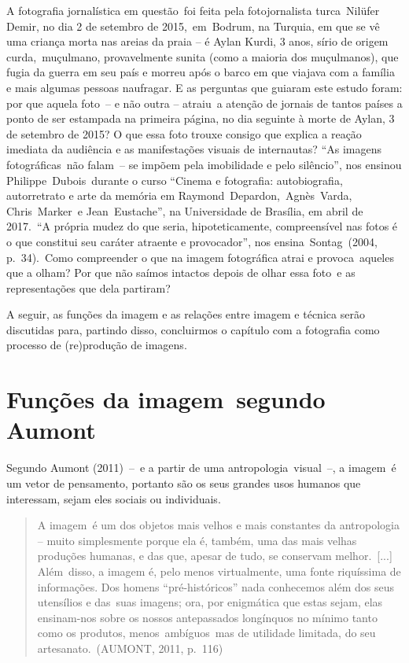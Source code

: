 \documentclass[
  letterpaper,
]{abntex2}
\begin{document}
A fotografia jornalística em questão~foi feita pela fotojornalista
turca~Nilüfer Demir, no dia 2 de setembro de 2015,~em~Bodrum, na
Turquia, em que se vê uma criança morta nas areias da praia -- é Aylan
Kurdi, 3 anos, sírio de origem curda,~muçulmano, provavelmente sunita
(como a maioria dos muçulmanos), que fugia da guerra em seu país e
morreu após o barco em que viajava com a família e mais algumas pessoas
naufragar. E as perguntas que guiaram este estudo foram: por que aquela
foto~-- e não outra -- atraiu~a atenção de jornais de tantos países a
ponto de ser estampada na primeira página, no dia seguinte à morte de
Aylan, 3 de setembro de 2015? O que essa foto trouxe consigo que explica
a reação imediata da audiência e as manifestações visuais de
internautas? ``As imagens fotográficas~não falam~-- se impõem pela
imobilidade e pelo silêncio'', nos ensinou Philippe~Dubois~durante o
curso ``Cinema e fotografia: autobiografia, autorretrato e arte da
memória em Raymond~Depardon,~Agnès~Varda, Chris~Marker~e
Jean~Eustache'', na Universidade de Brasília, em abril de 2017.~``A
própria mudez do que seria, hipoteticamente, compreensível nas fotos é o
que constitui seu caráter atraente e provocador'', nos
ensina~Sontag~(2004, p.~34).~Como compreender o que na imagem
fotográfica atrai e provoca~aqueles que a olham? Por que não saímos
intactos depois de olhar essa foto~e as representações que dela
partiram?

A seguir, as funções da imagem e as relações entre imagem e técnica
serão discutidas para, partindo disso, concluirmos o capítulo com a
fotografia como processo de (re)produção de imagens.~ ~

\hypertarget{funuxe7uxf5es-da-imagem-segundo-aumont}{%
\section{Funções da imagem~segundo
Aumont~}\label{funuxe7uxf5es-da-imagem-segundo-aumont}}

Segundo Aumont (2011)~--~e a partir de uma antropologia~visual~--, a
imagem~é um vetor de pensamento, portanto são os seus grandes usos
humanos que interessam, sejam eles sociais ou individuais.~ ~

\begin{quote}
A imagem~é um dos objetos mais velhos e mais constantes da antropologia
-- muito simplesmente porque ela é, também, uma das mais velhas
produções humanas, e das que, apesar de tudo, se conservam
melhor.~{[}...{]} Além~disso, a imagem é, pelo menos virtualmente, uma
fonte riquíssima de informações. Dos homens ``pré-históricos'' nada
conhecemos além dos seus utensílios e das~suas imagens; ora, por
enigmática que estas sejam, elas ensinam-nos sobre os nossos
antepassados longínquos no mínimo tanto como os produtos,
menos~ambíguos~mas de utilidade limitada, do seu artesanato.~(AUMONT,
2011, p.~116)~ ~
\end{quote}
\end{document}

